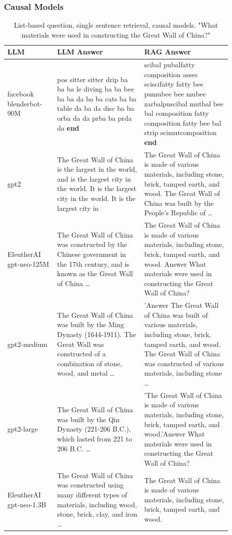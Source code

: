 \documentclass{wseas}
\begin{document}
\subsubsection{Causal Models}


\begin{table}[htbp]
  \centering
  \caption{List-based question, single sentence retrieval, causal models. "What materials were used in constructing the Great Wall of China?"}
  \label{tab:experiment_Q_listBased_R_1Sentence_Q_listBased_M_casualModel_table}  
  \begin{tabular}{|p{0.20\linewidth}|p{0.35\linewidth}|p{0.35\linewidth}|}
    \hline
    \textbf{LLM} & \textbf{LLM Answer} & \textbf{RAG Answer} \\ \hline
    facebook blenderbot-90M & pos sitter sitter drip ba ba ba le diving ba ba bee ba ba da ba ba cats ba ba table da ba da disc ba ba orba da da prba ba prda da \textbf{end} & scibal pubalfatty composition asses sciscifatty fatty bee pumubee bee mubee zarbalpuscibal mutbal bee bal composition fatty composition fatty bee bal strip scimutcomposition \textbf{end} \\ \hline
    gpt2 & The Great Wall of China is the largest in the world, and is the largest city in the world. It is the largest city in the world. It is the largest city in & The Great Wall of China is made of various materials, including stone, brick, tamped earth, and wood. The Great Wall of China was built by the People's Republic of \ldots{} \\ \hline
    EleutherAI gpt-neo-125M & The Great Wall of China was constructed by the Chinese government in the 17th century, and is known as the Great Wall of China \ldots{} & The Great Wall of China is made of various materials, including stone, brick, tamped earth, and wood. Answer What materials were used in constructing the Great Wall of China? \\ \hline
    gpt2-medium & The Great Wall of China was built by the Ming Dynasty (1644-1911). The Great Wall was constructed of a combination of stone, wood, and metal \ldots{} & 'Answer The Great Wall of China was built of various materials, including stone, brick, tamped earth, and wood. The Great Wall of China was constructed of various materials, including stone \ldots{} \\ \hline
    gpt2-large & The Great Wall of China was built by the Qin Dynasty (221-206 B.C.), which lasted from 221 to 206 B.C. \ldots{} & 'The Great Wall of China is made of various materials, including stone, brick, tamped earth, and wood.'Answer What materials were used in constructing the Great Wall of China? \\ \hline
    EleutherAI gpt-neo-1.3B & The Great Wall of China was constructed using many different types of materials, including wood, stone, brick, clay, and iron \ldots{} & The Great Wall of China is made of various materials, including stone, brick, tamped earth, and wood. \\ \hline
  \end{tabular}
\end{table}
\end{document}
